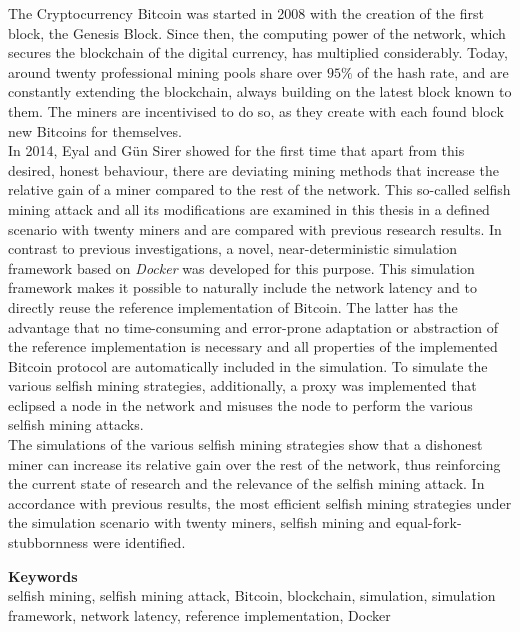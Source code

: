 The Cryptocurrency Bitcoin was started in 2008 with the creation of the first block, the Genesis Block. 
Since then, the computing power of the network, which secures the blockchain of the digital currency, has multiplied considerably.
Today, around twenty professional mining pools share over $ 95\% $ of the hash rate, and are constantly extending the blockchain, always building on the latest block known to them.
The miners are incentivised to do so, as they create with each
found block new Bitcoins for themselves.\\
In 2014, Eyal and Gün Sirer showed for the first time that apart from this desired, honest behaviour, there are deviating mining methods that increase the relative gain of a miner compared to the rest of the network.
This so-called selfish mining attack and all its modifications are examined in this thesis in a defined scenario with twenty miners and are compared with previous research results.
In contrast to previous investigations, a novel, near-deterministic simulation framework based on \textit{Docker} was developed for this purpose.
This simulation framework makes it possible to naturally include the network latency and to directly reuse the reference implementation of Bitcoin.
The latter has the advantage that no time-consuming and error-prone adaptation or abstraction of the reference implementation is necessary and all properties of the implemented Bitcoin protocol are automatically included in the simulation.
To simulate the various selfish mining strategies, additionally, a proxy was implemented that eclipsed a node in the network and misuses the node to perform the various selfish mining attacks.\\
The simulations of the various selfish mining strategies show that a dishonest miner can increase its relative gain over the rest of the network, thus reinforcing the current state of research and the relevance of the selfish mining attack.
In accordance with previous results, the most efficient selfish mining strategies under the simulation scenario with twenty miners, selfish mining and equal-fork-stubbornness were identified.

\bigskip
\noindent \textbf{Keywords}\\
selfish mining, selfish mining attack, Bitcoin, blockchain, simulation, simulation framework, network latency, reference implementation, Docker
